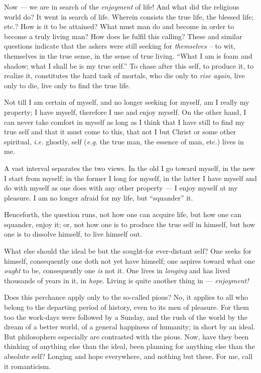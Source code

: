 Now --- we are in search of the \textit{enjoyment} of life! And what did the 
religious world do? It went in search of life. Wherein consists the true life, 
the blessed life; etc.? How is it to be attained? What must man do and become 
in order to become a truly living man? How does he fulfil this calling? These 
and similar questions indicate that the askers were still seeking for 
\textit{themselves --} to wit, themselves in the true sense, in the sense of 
true living. ``What I am is foam and shadow; what I shall be is my true 
self.'' To chase after this self, to produce it, to realize it, constitutes 
the hard task of mortals, who die only to \textit{rise again}, live only to 
die, live only to find the true life.

Not till I am certain of myself, and no longer seeking for myself, am I really 
my property; I have myself, therefore I use and enjoy myself. On the other 
hand, I can never take comfort in myself as long as I think that I have still 
to find my true self and that it must come to this, that not I but Christ or 
some other spiritual, \textit{i.e.} ghostly, self (\textit{e.g.} the true 
man, the essence of man, etc.) lives in me.

A vast interval separates the two views. In the old I go toward myself, in the 
new I start from myself; in the former I long for myself, in the latter I have 
myself and do with myself as one does with any other property --- I enjoy 
myself at my pleasure. I am no longer afraid for my life, but ``squander'' 
it.

Henceforth, the question runs, not how one can acquire life, but how one can 
squander, enjoy it; or, not how one is to produce the true self in himself, 
but how one is to dissolve himself, to live himself out.

What else should the ideal be but the sought-for ever-distant self? One seeks 
for himself, consequently one doth not yet have himself; one aspires toward 
what one \textit{ought} to be, consequently one \textit{is} not it. One lives 
in \textit{longing} and has lived thousands of years in it, in \textit{hope}. 
Living is quite another thing in --- \textit{enjoyment!}

Does this perchance apply only to the so-called pious? No, it applies to all 
who belong to the departing period of history, even to its men of pleasure. 
For them too the work-days were followed by a Sunday, and the rush of the 
world by the dream of a better world, of a general happiness of humanity; in 
short by an ideal. But philosophers especially are contrasted with the pious. 
Now, have they been thinking of anything else than the ideal, been planning 
for anything else than the absolute self? Longing and hope everywhere, and 
nothing but these. For me, call it romanticism.

